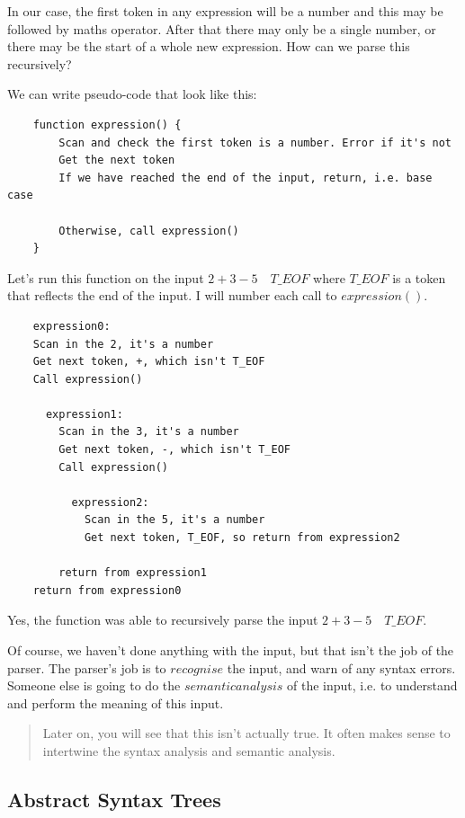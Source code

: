 \documentclass[journal, onecolumn, 12pt]{IEEEtran}
\begin{document}
In our case, the first token in any expression will be a number and this may be followed by maths operator. After that there may only be a single number, or there may be the start of a whole new expression. How can we parse this recursively?

We can write pseudo-code that look like this:

\begin{lstlisting}
    function expression() {
        Scan and check the first token is a number. Error if it's not
        Get the next token
        If we have reached the end of the input, return, i.e. base case

        Otherwise, call expression()
    }
\end{lstlisting}

Let's run this function on the input $2 + 3 - 5\quad T\_EOF$ where $T\_EOF$ is a token that reflects the end of the input. I will number each call to $expression()$.

\begin{lstlisting}
    expression0:
    Scan in the 2, it's a number
    Get next token, +, which isn't T_EOF
    Call expression()

      expression1:
        Scan in the 3, it's a number
        Get next token, -, which isn't T_EOF
        Call expression()

          expression2:
            Scan in the 5, it's a number
            Get next token, T_EOF, so return from expression2

        return from expression1
    return from expression0
\end{lstlisting}

Yes, the function was able to recursively parse the input $2 + 3 - 5\quad T\_EOF$.

Of course, we haven't done anything with the input, but that isn't the job of the parser. The parser's job is to $recognise$ the input, and warn of any syntax errors. Someone else is going to do the $semantic analysis$ of the input, i.e. to understand and perform the meaning of this input.

\begin{quote}
Later on, you will see that this isn't actually true. It often makes sense to intertwine the syntax analysis and semantic analysis.
\end{quote}

\subsection{Abstract Syntax Trees}
\end{document}

